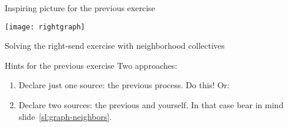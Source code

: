 
\begin{exerciseframe}[rightgraph]
  \hyperlink{exserialsend}{}

  
\end{exerciseframe}

\begin{numberedframe}{Inspiring picture for the previous exercise}
  \label{fig:rightgraph}

  \texttt{[image: rightgraph]}

  Solving the right-send exercise with neighborhood
  collectives
\end{numberedframe}

\begin{numberedframe}{Hints for the previous exercise}
  Two approaches:
  \begin{enumerate}
  \item Declare just one source: the previous process. Do this! Or:
  \item Declare two sources: the previous and yourself.
    In that case bear in mind slide~\ref{sl:graph-neighbors}.
  \end{enumerate}
\end{numberedframe}

\endinput

\begin{numberedframe}{}
\end{numberedframe}

